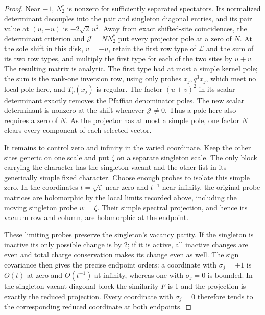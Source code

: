 \begin{proof}
Near $-1$, $N_2^*$ is nonzero for sufficiently separated spectators.
Its normalized determinant decouples into the pair and singleton
diagonal entries, and its pair value at $(u,-u)$ is
$-2\sqrt2\,u^2$. Away from exact shifted-site coincidences, the
determinant criterion and $\mathcal J=NN_2^*$ put every projector
pole at a zero of $N$. At the sole shift in this disk, $v=-u$, retain
the first row type of $\mathcal L$ and the sum of its two row types,
and multiply the first type for each of the two sites by $u+v$.
The resulting matrix is analytic. The first type had at most a simple
kernel pole; the sum is the rank-one inversion row, using only probes
$x_j,q^3x_j$, which meet no local pole here, and $T_p(x_j)$ is regular.
The factor $(u+v)^2$ in its scalar determinant exactly removes the
Pfaffian denominator poles. The new scalar determinant is nonzero
at the shift whenever $\mathcal J\ne0$. Thus a pole here also requires
a zero of $N$. As the projector has at most a simple pole, one factor
$N$ clears every component of each selected vector.

It remains to control zero and infinity in the varied coordinate.
Keep the other sites generic on one scale and put $\zeta$ on a separate
singleton scale. The only block carrying the character has the
singleton vacant and the other list in its generically simple fixed
character. Choose enough probes to isolate this simple zero. In the
coordinates $t=\sqrt\zeta$ near zero and $t^{-1}$ near infinity,
the original probe matrices are holomorphic by the local limits
recorded above, including the moving singleton probe $w=\zeta$.
Their simple spectral projection, and hence its vacuum row and column,
are holomorphic at the endpoint.

These limiting probes preserve the singleton's vacancy parity. If
the singleton is inactive its only possible change is by 2; if it is
active, all inactive changes are even and total charge conservation
makes its change even as well. The sign covariance then gives the
precise endpoint orders: a coordinate with $\sigma_j=\pm1$ is
$O(t)$ at zero and $O(t^{-1})$ at infinity, whereas one with
$\sigma_j=0$ is bounded. In the singleton-vacant diagonal block the
similarity $F$ is 1 and the projection is exactly the reduced
projection. Every coordinate with $\sigma_j=0$ therefore tends to
the corresponding reduced coordinate at both endpoints.


\end{proof}
